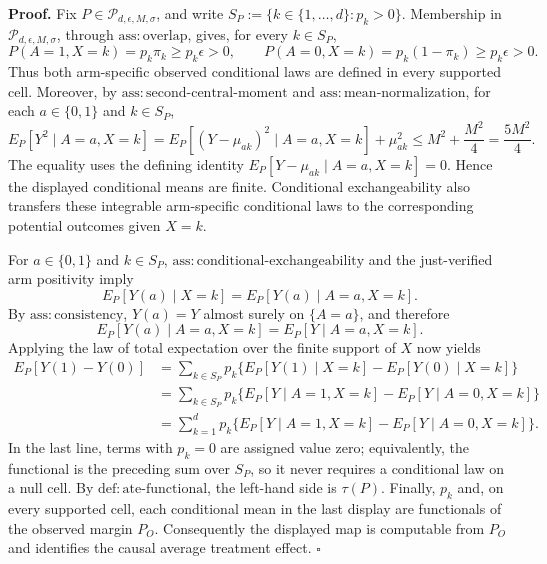 \textbf{Proof.}
Fix \(P\in\mathcal P_{d,\epsilon,M,\sigma}\), and write
\(S_P:=\{k\in\{1,\ldots,d\}:p_k>0\}\).  Membership in
\(\mathcal P_{d,\epsilon,M,\sigma}\), through
\(\mathrm{ass:overlap}\), gives, for every \(k\in S_P\),
\[
 P(A=1,X=k)=p_k\pi_k\ge p_k\epsilon>0,
 \qquad
 P(A=0,X=k)=p_k(1-\pi_k)\ge p_k\epsilon>0.
\]
Thus both arm-specific observed conditional laws are defined in every
supported cell.  Moreover, by \(\mathrm{ass:second\text{-}central\text{-}moment}\)
and \(\mathrm{ass:mean\text{-}normalization}\), for each
\(a\in\{0,1\}\) and \(k\in S_P\),
\[
 E_P[Y^2\mid A=a,X=k]
 =E_P[(Y-\mu_{ak})^2\mid A=a,X=k]+\mu_{ak}^2
 \le M^2+\frac{M^2}{4}=\frac{5M^2}{4}.
\]
The equality uses the defining identity
\(E_P[Y-\mu_{ak}\mid A=a,X=k]=0\).  Hence the displayed conditional
means are finite.  Conditional exchangeability also transfers these
integrable arm-specific conditional laws to the corresponding potential
outcomes given \(X=k\).

For \(a\in\{0,1\}\) and \(k\in S_P\),
\(\mathrm{ass:conditional\text{-}exchangeability}\) and the just-verified
arm positivity imply
\[
 E_P[Y(a)\mid X=k]
 =E_P[Y(a)\mid A=a,X=k].
\]
By \(\mathrm{ass:consistency}\), \(Y(a)=Y\) almost surely on
\(\{A=a\}\), and therefore
\[
 E_P[Y(a)\mid A=a,X=k]
 =E_P[Y\mid A=a,X=k].
\]
Applying the law of total expectation over the finite support of \(X\)
now yields
\[
 \begin{aligned}
 E_P[Y(1)-Y(0)]
 &=\sum_{k\in S_P}p_k
   \bigl\{E_P[Y(1)\mid X=k]-E_P[Y(0)\mid X=k]\bigr\}\\
 &=\sum_{k\in S_P}p_k
   \bigl\{E_P[Y\mid A=1,X=k]-E_P[Y\mid A=0,X=k]\bigr\}\\
 &=\sum_{k=1}^{d}p_k
   \bigl\{E_P[Y\mid A=1,X=k]-E_P[Y\mid A=0,X=k]\bigr\}.
 \end{aligned}
\]
In the last line, terms with \(p_k=0\) are assigned value zero; equivalently,
the functional is the preceding sum over \(S_P\), so it never requires a
conditional law on a null cell.  By \(\mathrm{def:ate\text{-}functional}\),
the left-hand side is \(\tau(P)\).  Finally, \(p_k\) and, on every supported
cell, each conditional mean in the last display are functionals of the
observed margin \(P_O\).  Consequently the displayed map is computable from
\(P_O\) and identifies the causal average treatment effect. \(\square\)
